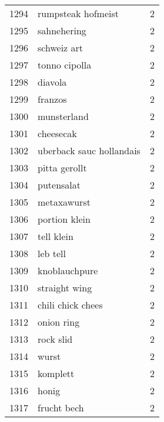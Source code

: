 \begin{tabular}{llr}
1294 &                                 rumpsteak hofmeist &      2 \\
1295 &                                        sahnehering &      2 \\
1296 &                                        schweiz art &      2 \\
1297 &                                      tonno cipolla &      2 \\
1298 &                                            diavola &      2 \\
1299 &                                            franzos &      2 \\
1300 &                                        munsterland &      2 \\
1301 &                                          cheesecak &      2 \\
1302 &                           uberback sauc hollandais &      2 \\
1303 &                                      pitta gerollt &      2 \\
1304 &                                         putensalat &      2 \\
1305 &                                        metaxawurst &      2 \\
1306 &                                      portion klein &      2 \\
1307 &                                         tell klein &      2 \\
1308 &                                           leb tell &      2 \\
1309 &                                      knoblauchpure &      2 \\
1310 &                                      straight wing &      2 \\
1311 &                                  chili chick chees &      2 \\
1312 &                                         onion ring &      2 \\
1313 &                                          rock slid &      2 \\
1314 &                                              wurst &      2 \\
1315 &                                           komplett &      2 \\
1316 &                                              honig &      2 \\
1317 &                                        frucht bech &      2 \\

\end{tabular}
